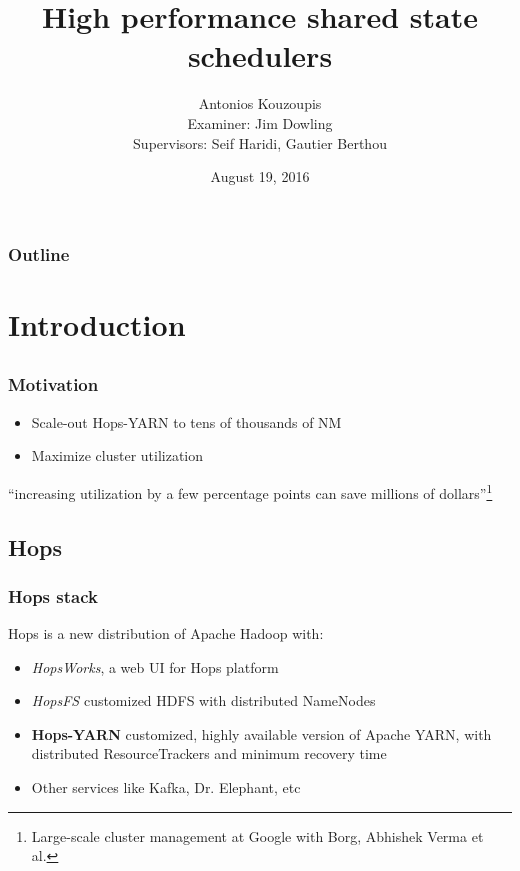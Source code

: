 \documentclass{beamer}
\title{High performance shared state schedulers}
\author[AK]{Antonios Kouzoupis\\[1em]{\footnotesize Examiner: Jim
    Dowling\\Supervisors: Seif Haridi, Gautier Berthou}}
\institute[KTH/SICS]{}
\date[date]{August 19, 2016}
\begin{document}
\section{}
\begin{frame}
\titlepage
\end{frame}

\section*{}
\begin{frame}
\frametitle{Outline}
\footnotesize
\tableofcontents
\normalsize
\end{frame}

\section{Introduction}
\subsection*{}
\begin{frame}
\frametitle{Motivation}

\begin{itemize}
\item Scale-out Hops-YARN to tens of thousands of NM
\item Maximize cluster utilization
\end{itemize}

\centering
\vfill
``increasing utilization by a few percentage points can save millions
of dollars''\footnote{Large-scale cluster management at Google with
  Borg, Abhishek Verma et al.}
\end{frame}

\subsection{Hops}
\begin{frame}
\frametitle{Hops stack}
Hops is a new distribution of Apache Hadoop with:
\begin{itemize}
\item \emph{HopsWorks}, a web UI for Hops platform
\item \emph{HopsFS} customized HDFS with distributed NameNodes
\item \textbf{Hops-YARN} customized, highly available version of Apache
  YARN, with distributed ResourceTrackers and minimum recovery time
\item Other services like Kafka, Dr. Elephant, etc
\end{itemize}
\end{frame}
\end{document}
